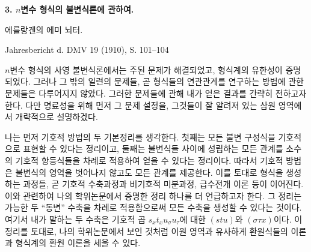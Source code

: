 
\begin{center}
{\Large\bfseries 3. $n$변수 형식의 불변식론에 관하여.}\par
\vspace{1.2em}
에를랑겐의 \textsc{에미 뇌터}.\par
\medskip
Jahresbericht d. DMV 19 (1910), S. 101--104
\end{center}

\vspace{1em}
$n$변수 형식의 사영 불변식론에서는 주된 문제가 해결되었고, 형식계의 유한성이 증명되었다. 그러나 그 밖의 일련의 문제들, 곧 형식들의 연관관계를 연구하는 방법에 관한 문제들은 다루어지지 않았다. 그러한 문제들에 관해 내가 얻은 결과를 간략히 전하고자 한다. 다만 명료성을 위해 먼저 그 문제 설정을, 그것들이 잘 알려져 있는 삼원 영역에서 개략적으로 설명하겠다.

나는 먼저 기호적 방법의 두 기본정리를 생각한다. 첫째는 모든 불변 구성식을 기호적으로 표현할 수 있다는 정리이고, 둘째는 불변식들 사이에 성립하는 모든 관계를 소수의 기호적 항등식들을 차례로 적용하여 얻을 수 있다는 정리이다. 따라서 기호적 방법은 불변식의 영역을 벗어나지 않고도 모든 관계를 제공한다. 이를 토대로 형식을 생성하는 과정들, 곧 기호적 수축과정과 비기호적 미분과정, 급수전개 이론 등이 이어진다. 이와 관련하여 나의 학위논문에서 증명한 정리 하나를 더 언급하고자 한다. 그 정리는 가능한 두 ``동변'' 수축을 차례로 적용함으로써 모든 수축을 생성할 수 있다는 것이다. 여기서 내가 말하는 두 수축은 기호적 곱 $s_x t_x u_\sigma u_\tau$에 대한 $(stu)$와 $(\sigma\tau x)$이다. 이 정리를 토대로, 나의 학위논문에서 보인 것처럼 이원 영역과 유사하게 환원식들의 이론과 형식계의 환원 이론을 세울 수 있다.

